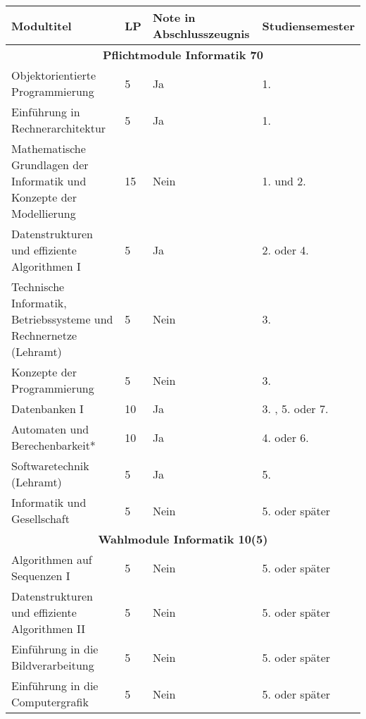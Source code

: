 \begin{table}[tbp]
    \begin{footnotesize}
    \begin{tabularx}{\textwidth}{|b{}|X|X|X|}
        \hline
        Modultitel                                                            & LP & Note in Abschlusszeugnis & Studien\-semester \\
        \hline
        \multicolumn{4}{|c|}{\textbf{Pflichtmodule Informatik 70}}\\\hline
        Objektorientierte Programmierung                                      &  5 & Ja   & 1. \\
        Einführung in Rechnerarchitektur                                      &  5 & Ja   & 1. \\
        Mathematische Grundlagen der Informatik und Konzepte der Modellierung & 15 & Nein & 1. und 2. \\
        Datenstrukturen und effiziente Algorithmen I                          &  5 & Ja   & 2. oder 4. \\
        Technische Informatik, Betriebssysteme und Rechnernetze (Lehramt)     &  5 & Nein & 3. \\
        Konzepte der Programmierung                                           &  5 & Nein & 3. \\
        Datenbanken I                                                         & 10 & Ja   & 3. , 5. oder 7. \\
        Automaten und Berechenbarkeit*                                        & 10 & Ja   & 4. oder 6. \\
        Softwaretechnik (Lehramt)                                             &  5 & Ja   & 5. \\
        Informatik und Gesellschaft                                           &  5 & Nein & 5. oder später \\
        \hline
        \multicolumn{4}{|c|}{\textbf{Wahlmodule Informatik 10(5)}}\\\hline
        Algorithmen auf Sequenzen I                      & 5 & Nein & 5. oder später \\
        Datenstrukturen und effiziente Algorithmen II    & 5 & Nein & 5. oder später \\
        Einführung in die Bildverarbeitung               & 5 & Nein & 5. oder später \\
        Einführung in die Computergrafik                & 5 & Nein & 5. oder später \\

\end{tabularx}
\end{footnotesize}
\end{table}
